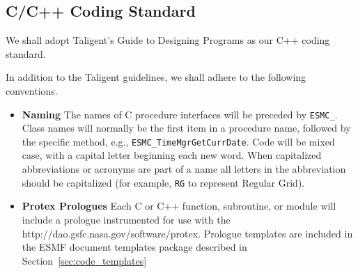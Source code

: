 
\subsection{C/C++ Coding Standard}

We shall adopt Taligent's Guide to Designing Programs \cite{taligent} 
as our C++ coding standard.  

In addition to the Taligent guidelines, we shall adhere to the following
conventions.

\begin{itemize}
\item {\bf Naming} The names of C procedure interfaces will be preceded 
by {\tt ESMC\_}.  Class names will normally be the first item in a procedure 
name, followed by the specific method, e.g., {\tt ESMC\_TimeMgrGetCurrDate}.  
Code will be mixed case, with a capital letter beginning each new word.
When capitalized abbreviations or acronyms are part of a name all letters 
in the abbreviation should be capitalized (for example, {\tt RG} to represent 
Regular Grid). 

\item {\bf Protex Prologues}  Each C or C++ function, subroutine, or 
module will include a prologue instrumented for use with the
{http://dao.gsfc.nasa.gov/software/protex}.  Prologue templates are
included in the ESMF document templates package described in Section~\ref{sec:code_templates}
\end{itemize}

















